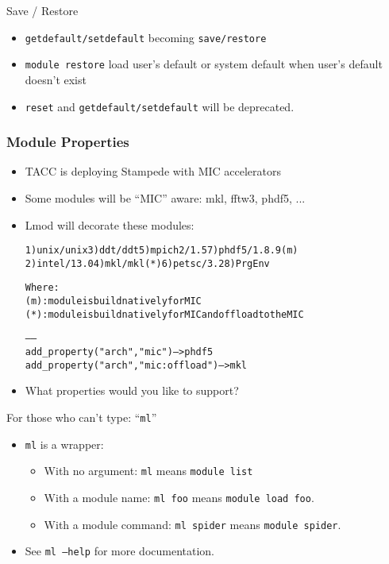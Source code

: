 \documentclass{beamer}
\begin{document}
\begin{frame}{Save / Restore}
  \begin{itemize}
    \item \texttt{getdefault/setdefault} becoming \texttt{save/restore}
    \item \texttt{module restore} load user's default or system
      default when user's default doesn't exist
    \item \texttt{reset} and \texttt{getdefault/setdefault} will be deprecated.
  \end{itemize}
\end{frame}

\begin{frame}[fragile]
    \frametitle{Module Properties}
  \begin{itemize}
    \item TACC is deploying Stampede with MIC accelerators
    \item Some modules will be ``MIC'' aware: mkl, fftw3, phdf5, ...
    \item Lmod will decorate these modules:
  {\tiny
    \begin{alltt}
  1) unix/unix     3) ddt/ddt       5) mpich2/1.5    7) {\color{blue}phdf5/1.8.9 (m)}
  2) intel/13.0    4) {\color{red}mkl/mkl (*)}   6) petsc/3.2     8) PrgEnv

  Where:
   {\color{blue}(m)}:  module is build natively for MIC
   {\color{red}(*)}:  module is build natively for MIC and offload to the MIC

   ------
   add_property("arch","mic")              -- > phdf5
   add_property("arch","mic:offload")      -- > mkl
    \end{alltt}
}
  \item What properties would you like to support?
  \end{itemize}
\end{frame}


\begin{frame}{For those who can't type: ``\texttt{ml}''}
  \begin{itemize}
    \item \texttt{ml} is a wrapper:
      \begin{itemize}
        \item With no argument: \texttt{ml} means \texttt{module list}
        \item With a module name: \texttt{ml foo} means \texttt{module
            load foo}.
        \item With a module command: \texttt{ml spider} means
          \texttt{module spider}.
      \end{itemize}
    \item See \texttt{ml --help} for more documentation.
  \end{itemize}
\end{frame}
\end{document}
